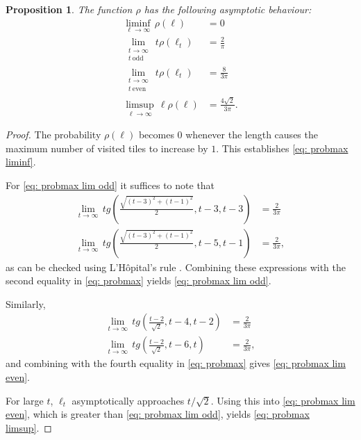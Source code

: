 \documentclass[12pt, a4paper]{article}
\newcommand{\probmax}{\rho} %
\newcommand{\len}{\ell} %
\newcommand{\tiles}{t} %
\newtheorem{proposition}{Proposition}%
\begin{document}
\begin{proposition}
The function $\probmax$ has the following asymptotic behaviour:
\begin{align}
\label{eq: probmax liminf}
\liminf_{\len \rightarrow \infty}\, \probmax(\len) & = 0 \\ 
\label{eq: probmax lim odd}
\lim_{\substack{\tiles \rightarrow \infty \\
\tiles \ \mathrm{odd}}}\, \tiles \probmax(\len_\tiles) & = \frac 2 \pi \\
\label{eq: probmax lim even}
\lim_{\substack{\tiles \rightarrow \infty \\ \tiles \ \mathrm{even}}}\, \tiles \probmax(\len_\tiles) & = \frac 8 {3\pi} \\
\label{eq: probmax limsup}
\limsup_{\len \rightarrow \infty}\, \len \probmax(\len) & = \frac {4\sqrt{2}}{3\pi}.
\end{align}
\end{proposition}

\begin{proof}
The probability $\probmax(\len)$ becomes $0$ whenever the length causes the maximum number of visited tiles to increase by $1$. This establishes \eqref{eq: probmax liminf}.

For \eqref{eq: probmax lim odd} it suffices to note that
\begin{align}
\label{eq: tedious limit, odd 1}
\lim_{\tiles \rightarrow \infty}\, \tiles g\left(\frac{\sqrt{(\tiles-3)^2+(\tiles-1)^2}} 2, \tiles-3, \tiles-3 \right) &= \frac 2 {3\pi} \\
\label{eq: tedious limit, odd 2}
\lim_{\tiles \rightarrow \infty}\, \tiles g\left(\frac{\sqrt{(\tiles-3)^2+(\tiles-1)^2}} 2, \tiles-5, \tiles-1 \right)
& = \frac 2 {3\pi},
\end{align}
as can be checked using L'H\^opital's rule \cite[section~5.3]{Abbott15}.
Combining these expressions with the second equality in \eqref{eq: probmax} yields \eqref{eq: probmax lim odd}.

Similarly,
\begin{align}
\label{eq: tedious limit, even 1}
\lim_{\tiles \rightarrow \infty}\, \tiles g\left(\frac{\tiles-2}{\sqrt 2}, \tiles-4, \tiles-2 \right) &= \frac 2 {3\pi} \\
\label{eq: tedious limit, even 2}
\lim_{\tiles \rightarrow \infty}\, \tiles g\left(\frac{\tiles-2}{\sqrt 2}, \tiles-6, \tiles \right)
& = \frac 2 {3\pi},
\end{align}
and combining with the fourth equality in \eqref{eq: probmax} gives \eqref{eq: probmax lim even}.

For large $\tiles$, $\len_\tiles$ asymptotically approaches $\tiles/\sqrt{2}$. Using this into \eqref{eq: probmax lim even}, which is greater than \eqref{eq: probmax lim odd}, yields \eqref{eq: probmax limsup}.
\end{proof}




\end{document}
